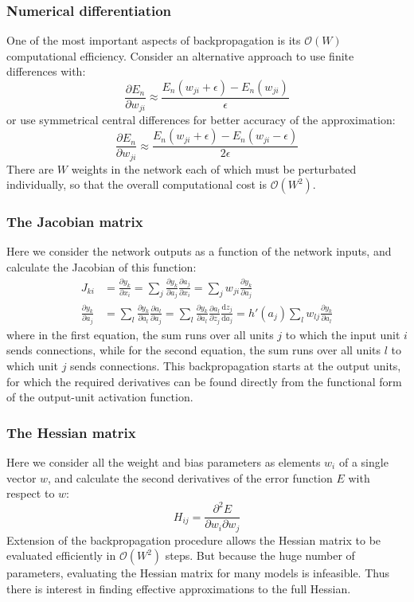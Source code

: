 \documentclass{beamer}
\begin{document}
\begin{frame}
    \frametitle{Numerical differentiation}
    One of the most important aspects of backpropagation is its $\mathcal{O}(W)$ computational efficiency. Consider an alternative approach to use finite differences with:
    \begin{equation*}
        \frac{\partial{}E_{n}}{\partial{}w_{ji}}\approx\frac{E_{n}(w_{ji}+\epsilon)-E_{n}(w_{ji})}{\epsilon}
    \end{equation*}
    or use symmetrical central differences for better accuracy of the approximation:
    \begin{equation*}
        \frac{\partial{}E_{n}}{\partial{}w_{ji}}\approx\frac{E_{n}(w_{ji}+\epsilon)-E_{n}(w_{ji}-\epsilon)}{2\epsilon}
    \end{equation*}
    There are $W$ weights in the network each of which must be perturbated individually, so that the overall computational cost is $\mathcal{O}(W^{2})$.
\end{frame}

\begin{frame}
    \frametitle{The Jacobian matrix}
    Here we consider the network outputs as a function of the network inputs, and calculate the Jacobian of this function:
    \begin{align*}
        J_{ki}&=\frac{\partial{}y_{k}}{\partial{}x_{i}}=\sum_{j}\frac{\partial{}y_{k}}{\partial{}a_{j}}\frac{\partial{}a_{j}}{\partial{}x_{i}}=\sum_{j}w_{ji}\frac{\partial{}y_{k}}{\partial{}a_{j}} \\
        \frac{\partial{}y_{k}}{\partial{}a_{j}}&=\sum_{l}\frac{\partial{}y_{k}}{\partial{}a_{l}}\frac{\partial{}a_{l}}{\partial{}a_{j}}=\sum_{l}\frac{\partial{}y_{k}}{\partial{}a_{l}}\frac{\partial{}a_{l}}{\partial{}z_{j}}\frac{\mathrm{d}z_{j}}{\mathrm{d}a_{j}}=h'(a_{j})\sum_{l}w_{lj}\frac{\partial{}y_{k}}{\partial{}a_{l}}
    \end{align*}
    where in the first equation, the sum runs over all units $j$ to which the input unit $i$ sends connections, while for the second equation, the sum runs over all units $l$ to which unit $j$ sends connections. This backpropagation starts at the output units,
    for which the required derivatives can be found directly from the functional form of the output-unit activation function.
\end{frame}

\begin{frame}
    \frametitle{The Hessian matrix}
    Here we consider all the weight and bias parameters as elements $w_{i}$ of a single vector $w$, and calculate the second derivatives of the error function $E$ with respect to $w$:
    \begin{equation*}
        H_{ij}=\frac{\partial^{2}E}{\partial{}w_{i}\partial{}w_{j}}
    \end{equation*}
    Extension of the backpropagation procedure allows the Hessian matrix to be evaluated efficiently in $\mathcal{O}(W^{2})$ steps. But because the huge number of parameters, evaluating the Hessian matrix for many models is infeasible.
    Thus there is interest in finding effective approximations to the full Hessian.
\end{frame}
\end{document}
